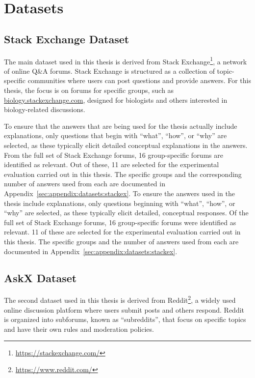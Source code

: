 \chapter{Datasets}%
\label{sec:datasets}

\section{Stack Exchange Dataset}%
\label{sec:datasets:stackex}
The main dataset used in this thesis is derived from Stack Exchange\footnote{\url{https://stackexchange.com/}}, a network of online Q\&A forums. Stack Exchange is structured as a collection of topic-specific communities where users can post questions and provide answers. For this thesis, the focus is on forums for specific groups, such as \url{biology.stackexchange.com}, designed for biologists and others interested in biology-related discussions.

To ensure that the answers that are being used for the thesis actually include explanations, only questions that begin with \enquote{what}, \enquote{how}, or \enquote{why} are selected, as these typically elicit detailed conceptual explanations in the answers. From the full set of Stack Exchange forums, \num{16} group-specific forums are identified as relevant. Out of these, \num{11} are selected for the experimental evaluation carried out in this thesis. The specific groups and the corresponding number of answers used from each are documented in Appendix~\ref{sec:appendix:datasets:stackex}.
To ensure the answers used in the thesis include explanations, only questions beginning with \enquote{what}, \enquote{how}, or \enquote{why} are selected, as these typically elicit detailed, conceptual responses. Of the full set of Stack Exchange forums, \num{16} group-specific forums were identified as relevant. \num{11} of these are selected for the experimental evaluation carried out in this thesis. The specific groups and the number of answers used from each are documented in Appendix~\ref{sec:appendix:datasets:stackex}.

\section{AskX Dataset}%
\label{sec:datasets:askx}
The second dataset used in this thesis is derived from Reddit\footnote{\url{https://www.reddit.com/}}, a widely used online discussion platform where users submit posts and others respond. Reddit is organized into subforums, known as \enquote{subreddits}, that focus on specific topics and have their own rules and moderation policies.

